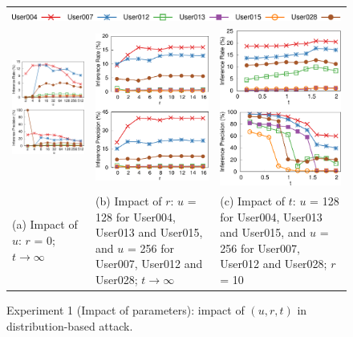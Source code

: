 \begin{figure}[t]
    \centering
    \begin{tabular}{p{}p{}p{}}
        \multicolumn{3}{c}{\includegraphics[width=.7\textwidth]{pic/legend-fsl-line.pdf}} \smallskip \\
        \includegraphics[width=.3\textwidth]{pic/distribution-impact-u.pdf} &
        \includegraphics[width=.3\textwidth]{pic/distribution-impact-r.pdf} &
	    \includegraphics[width=.3\textwidth]{pic/distribution-impact-t.pdf} \medskip \\
        {\footnotesize 
        \centering
        (a) Impact of $u$: $r$ = 0; $t \rightarrow \infty$
        } &
        {\footnotesize
        (b) Impact of $r$: $u$ = 128 for User004, User013 and User015, and $u$ = 256 for User007, User012 and User028; $t \rightarrow \infty$
        } &
        {\footnotesize
        (c) Impact of $t$: $u$ = 128 for User004, User013 and User015, and $u$ = 256 for User007, User012 and User028; $r$ = 10
        } \\
    \end{tabular}
    \caption{Experiment 1 (Impact of parameters): impact of $(u, r, t)$ in distribution-based attack.}
    \label{fig:distribution-impact}
\end{figure}


